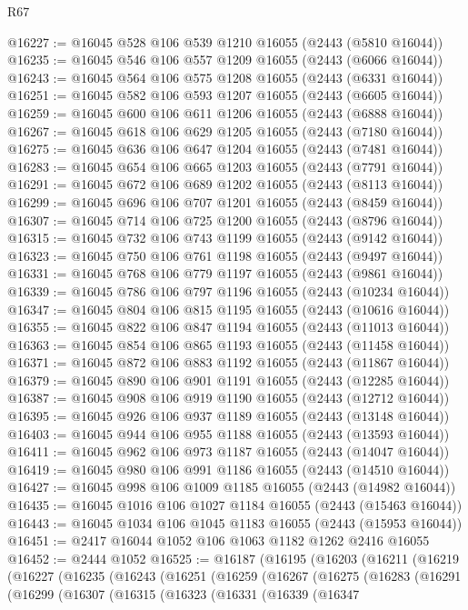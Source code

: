 \begin{lexlean}{R67}
\begin{coremodule}
@16227 := @16045 @528 @106 @539 @1210 @16055 (@2443 (@5810 @16044))
@16235 := @16045 @546 @106 @557 @1209 @16055 (@2443 (@6066 @16044))
@16243 := @16045 @564 @106 @575 @1208 @16055 (@2443 (@6331 @16044))
@16251 := @16045 @582 @106 @593 @1207 @16055 (@2443 (@6605 @16044))
@16259 := @16045 @600 @106 @611 @1206 @16055 (@2443 (@6888 @16044))
@16267 := @16045 @618 @106 @629 @1205 @16055 (@2443 (@7180 @16044))
@16275 := @16045 @636 @106 @647 @1204 @16055 (@2443 (@7481 @16044))
@16283 := @16045 @654 @106 @665 @1203 @16055 (@2443 (@7791 @16044))
@16291 := @16045 @672 @106 @689 @1202 @16055 (@2443 (@8113 @16044))
@16299 := @16045 @696 @106 @707 @1201 @16055 (@2443 (@8459 @16044))
@16307 := @16045 @714 @106 @725 @1200 @16055 (@2443 (@8796 @16044))
@16315 := @16045 @732 @106 @743 @1199 @16055 (@2443 (@9142 @16044))
@16323 := @16045 @750 @106 @761 @1198 @16055 (@2443 (@9497 @16044))
@16331 := @16045 @768 @106 @779 @1197 @16055 (@2443 (@9861 @16044))
@16339 := @16045 @786 @106 @797 @1196 @16055 (@2443 (@10234 @16044))
@16347 := @16045 @804 @106 @815 @1195 @16055 (@2443 (@10616 @16044))
@16355 := @16045 @822 @106 @847 @1194 @16055 (@2443 (@11013 @16044))
@16363 := @16045 @854 @106 @865 @1193 @16055 (@2443 (@11458 @16044))
@16371 := @16045 @872 @106 @883 @1192 @16055 (@2443 (@11867 @16044))
@16379 := @16045 @890 @106 @901 @1191 @16055 (@2443 (@12285 @16044))
@16387 := @16045 @908 @106 @919 @1190 @16055 (@2443 (@12712 @16044))
@16395 := @16045 @926 @106 @937 @1189 @16055 (@2443 (@13148 @16044))
@16403 := @16045 @944 @106 @955 @1188 @16055 (@2443 (@13593 @16044))
@16411 := @16045 @962 @106 @973 @1187 @16055 (@2443 (@14047 @16044))
@16419 := @16045 @980 @106 @991 @1186 @16055 (@2443 (@14510 @16044))
@16427 := @16045 @998 @106 @1009 @1185 @16055 (@2443 (@14982 @16044))
@16435 := @16045 @1016 @106 @1027 @1184 @16055 (@2443 (@15463 @16044))
@16443 := @16045 @1034 @106 @1045 @1183 @16055 (@2443 (@15953 @16044))
@16451 := @2417 @16044 @1052 @106 @1063 @1182 @1262 @2416 @16055
@16452 := @2444 @1052
@16525 := @16187
    (@16195
      (@16203
        (@16211
          (@16219
            (@16227
              (@16235
                (@16243
                  (@16251
                    (@16259
                      (@16267
                        (@16275
                          (@16283
                            (@16291
                              (@16299
                                (@16307
                                  (@16315
                                    (@16323
                                      (@16331
                                        (@16339
                                          (@16347

\end{coremodule}
\end{lexlean}
